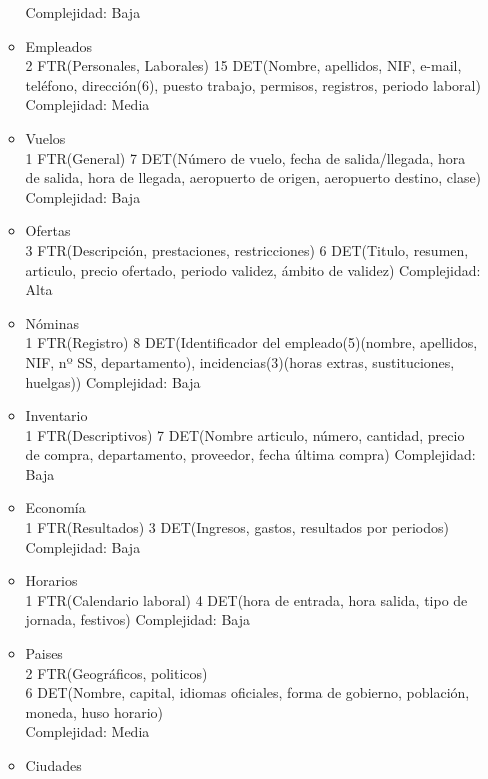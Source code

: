 \begin{enumerate}
\begin{itemize}
					Complejidad: Baja\\
				\item Empleados \\
					2 FTR(Personales, Laborales)
					15 DET(Nombre, apellidos, NIF, e-mail, teléfono, dirección(6), puesto trabajo, permisos, registros, periodo laboral)
					Complejidad: Media\\
				\item Vuelos\\
					1 FTR(General)
					7 DET(Número de vuelo, fecha de salida/llegada, hora de salida, hora de llegada, aeropuerto de origen, aeropuerto destino,
					clase)
					Complejidad: Baja\\
				\item Ofertas\\
					3 FTR(Descripción, prestaciones, restricciones)
					6 DET(Titulo, resumen, articulo, precio ofertado, periodo validez, ámbito de validez)
					Complejidad: Alta\\
				\item Nóminas\\
					1 FTR(Registro)
					8 DET(Identificador del empleado(5)(nombre, apellidos, NIF, nº SS, departamento), incidencias(3)(horas extras,
					sustituciones, huelgas))
					Complejidad: Baja\\
				\item Inventario\\
					1 FTR(Descriptivos)
					7 DET(Nombre articulo, número, cantidad, precio de compra, departamento, proveedor, fecha última compra)
					Complejidad: Baja\\
				\item Economía\\
					1 FTR(Resultados)
					3 DET(Ingresos, gastos, resultados por periodos)
					Complejidad: Baja\\
				\item Horarios\\
					1 FTR(Calendario laboral)
					4 DET(hora de entrada, hora salida, tipo de jornada, festivos)
					Complejidad: Baja\\
				\item Paises \\
					2 FTR(Geográficos, politicos) \\
					6 DET(Nombre, capital, idiomas oficiales, forma de gobierno, población, moneda, huso horario) \\
					Complejidad: Media\\	
				\item Ciudades \\

\end{itemize}
\end{enumerate}
